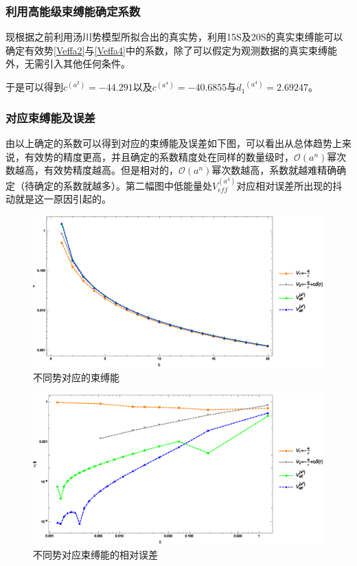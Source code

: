 \documentclass[hyperref,cs4size,titlepage,twoside]{ctexart}
\begin{document}
\subsubsection{利用高能级束缚能确定系数}
现根据之前利用汤川势模型所拟合出的真实势，利用15S及20S的真实束缚能可以确定有效势\eqref{Veffa2}与\eqref{Veffa4}中的系数，除了可以假定为观测数据的真实束缚能外，无需引入其他任何条件。

于是可以得到$c^{(a^2)}=-44.291$以及$c^{(a^4)}=-40.6855$与${d_1}^{(a^4)}=2.69247$。
\subsubsection{对应束缚能及误差}
由以上确定的系数可以得到对应的束缚能及误差如下图，可以看出从总体趋势上来说，有效势的精度更高，并且确定的系数精度处在同样的数量级时，$\mathcal{O}(a^n)$幂次数越高，有效势精度越高。但是相对的，$\mathcal{O}(a^n)$幂次数越高，系数就越难精确确定（待确定的系数就越多）。第二幅图中低能量处$V_{eff}^{(a^4)}$对应相对误差所出现的抖动就是这一原因引起的。
\begin{figure}[!htbp]
  \centering
  \includegraphics[width=6in]{Test_CurveFitting1_Figure2_1.eps}
  \caption{不同势对应的束缚能}
\end{figure}
\clearpage
\begin{figure}[!htbp]
  \centering
  \includegraphics[width=6in]{Test_CurveFitting1_Figure2.eps}
  \caption{不同势对应束缚能的相对误差}
\end{figure}
\end{document}
